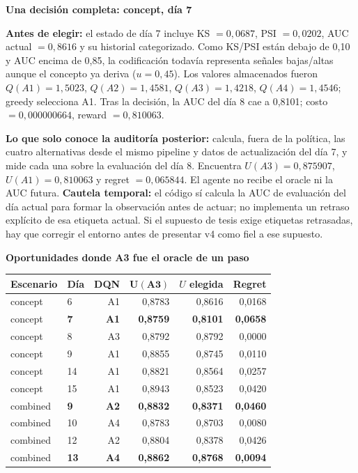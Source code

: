 \documentclass[10pt,a4paper]{article}
\newcommand{\smallsection}[1]{\vspace{2pt}\textbf{\large #1}\par\vspace{1pt}}
\begin{document}
\smallsection{Una decisión completa: concept, día 7}
\textbf{Antes de elegir:} el estado de día 7 incluye KS \(=0{,}0687\),
PSI \(=0{,}0202\), AUC actual \(=0{,}8616\) y su historial categorizado.
Como KS/PSI están debajo de 0,10 y AUC encima de 0,85, la codificación todavía
representa señales bajas/altas aunque el concepto ya deriva (\(u=0{,}45\)).
Los valores almacenados fueron \(Q(A1)=1{,}5023\), \(Q(A2)=1{,}4581\),
\(Q(A3)=1{,}4218\), \(Q(A4)=1{,}4546\); greedy selecciona A1. Tras la decisión,
la AUC del día 8 cae a 0,8101; costo \(=0{,}000000664\), reward
\(=0{,}810063\).

\textbf{Lo que solo conoce la auditoría posterior:} calcula, fuera de la
política, las cuatro alternativas desde el mismo pipeline y datos de
actualización del día 7, y mide cada una sobre la evaluación del día 8.
Encuentra \(U(A3)=0{,}875907\), \(U(A1)=0{,}810063\) y regret
\(=0{,}065844\). El agente no recibe el oracle ni la AUC futura. \textbf{Cautela
temporal:} el código sí calcula la AUC de evaluación del día actual para
formar la observación antes de actuar; no implementa un retraso explícito de
esa etiqueta actual. Si el supuesto de tesis exige etiquetas retrasadas, hay
que corregir el entorno antes de presentar v4 como fiel a ese supuesto.

\smallsection{Oportunidades donde A3 fue el oracle de un paso}
\scriptsize
\begin{tabular}{@{}llrrrr@{}}
\toprule
\textbf{Escenario} & \textbf{Día} & \textbf{DQN} & \(\boldsymbol{U(A3)}\) &
\textbf{\(U\) elegida} & \textbf{Regret} \\
\midrule
concept & 6 & A1 & 0,8783 & 0,8616 & 0,0168 \\
concept & \textbf{7} & \textbf{A1} & \textbf{0,8759} & \textbf{0,8101} & \textbf{0,0658} \\
concept & 8 & A3 & 0,8792 & 0,8792 & 0,0000 \\
concept & 9 & A1 & 0,8855 & 0,8745 & 0,0110 \\
concept & 14 & A1 & 0,8821 & 0,8564 & 0,0257 \\
concept & 15 & A1 & 0,8943 & 0,8523 & 0,0420 \\
combined & \textbf{9} & \textbf{A2} & \textbf{0,8832} & \textbf{0,8371} & \textbf{0,0460} \\
combined & 10 & A4 & 0,8783 & 0,8703 & 0,0080 \\
combined & 12 & A2 & 0,8804 & 0,8378 & 0,0426 \\
combined & \textbf{13} & \textbf{A4} & \textbf{0,8862} & \textbf{0,8768} & \textbf{0,0094} \\
\bottomrule
\end{tabular}
\small
\vspace{2pt}
\end{document}
